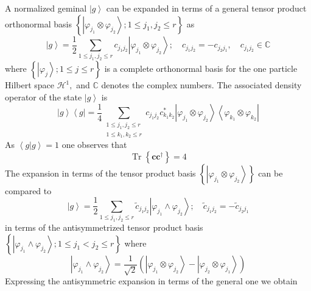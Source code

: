 \documentclass[aps,preprint]{revtex4}%
\begin{document}
A normalized geminal $\left\vert g\right\rangle $ can be expanded in terms of
a general tensor product orthonormal basis $\left\{  \left\vert \varphi
_{j_{1}}\otimes\varphi_{j_{2}}\right\rangle ;1\leq j_{1},j_{2}\leq r\right\}
$ as
\begin{equation}
\left\vert g\right\rangle =\frac{1}{2}\sum_{1\leq j_{1},j_{2}\leq r}%
c_{j_{1}j_{2}}\left\vert \varphi_{j_{1}}\otimes\varphi_{j_{2}}\right\rangle
;\quad c_{j_{1}j_{2}}=-c_{j_{2}j_{1}},\quad c_{j_{1}j_{2}}\in\mathbb{C}%
\end{equation}
where $\left\{  \left\vert \varphi_{j}\right\rangle ;1\leq j\leq r\right\}  $
is a complete orthonormal basis for the one particle Hilbert space
$\mathcal{H}^{1},$ and $\mathbb{C}$ denotes the complex numbers. The
associated density operator of the state $\left\vert g\right\rangle $ is
\begin{equation}
\left\vert g\right\rangle \left\langle g\right\vert =\frac{1}{4}%
\sum_{\substack{1\leq j_{1},j_{2}\leq r\\1\leq k_{1},k_{2}\leq r}%
}c_{j_{1}j_{2}}c_{k_{1}k_{2}}^{\ast}\left\vert \varphi_{j_{1}}\otimes
\varphi_{j_{2}}\right\rangle \left\langle \varphi_{k_{1}}\otimes\varphi
_{k_{2}}\right\vert
\end{equation}
As $\left\langle g|g\right\rangle =1$ one observes that
\begin{equation}
\operatorname{Tr}\left\{  \mathbf{cc}^{\dagger}\right\}  =4
\end{equation}
The expansion in terms of the tensor product basis $\left\{  \left\vert
\varphi_{j_{1}}\otimes\varphi_{j_{2}}\right\rangle \right\}  $ can be compared
to
\begin{equation}
\left\vert g\right\rangle =\frac{1}{2}\sum_{1\leq j_{1},j_{2}\leq r}\tilde
{c}_{j_{1}j_{2}}\left\vert \varphi_{j_{1}}\wedge\varphi_{j_{2}}\right\rangle
;\quad\tilde{c}_{j_{1}j_{2}}=-\tilde{c}_{j_{2}j_{1}}%
\end{equation}
in terms of the antisymmetrized tensor product basis $\left\{  \left\vert
\varphi_{j_{1}}\wedge\varphi_{j_{2}}\right\rangle ;1\leq j_{1}<j_{2}\leq
r\right\}  $ where
\begin{equation}
\left\vert \varphi_{j_{1}}\wedge\varphi_{j_{2}}\right\rangle =\frac{1}%
{\sqrt{2}}\left(  \left\vert \varphi_{j_{1}}\otimes\varphi_{j_{2}%
}\right\rangle -\left\vert \varphi_{j_{2}}\otimes\varphi_{j_{1}}\right\rangle
\right)
\end{equation}
Expressing the antisymmetric expansion in terms of the general one we obtain
\end{document}
